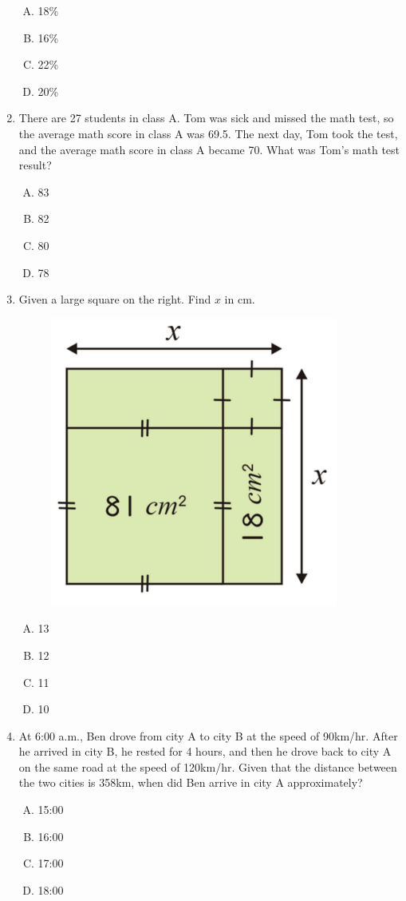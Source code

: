 \documentclass[11pt]{scrartcl}
\begin{document}
\begin{enumerate}
\begin{enumerate}[(A)]
    \item 18\% \item 16\% \item 22\% \item 20\%
\end{enumerate}

\newpage
\item There are 27 students in class A. Tom was sick and missed the math test, so the average math score in class A was 69.5. The next day, Tom took the test, and the average math score in class A became 70. What was Tom's math test result?
\begin{enumerate}[(A)]
    \item 83 \item 82 \item 80 \item 78
\end{enumerate}

\item Given a large square on the right. Find $x$ in cm.
\begin{figure}[h]
    \centering
    \includegraphics{StarGen/0Figure/wmi-2020-5a-square.png}
\end{figure}
\begin{enumerate}[(A)]
    \item 13 \item 12 \item 11 \item 10
\end{enumerate}

\item At 6:00 a.m., Ben drove from city A to city B at the speed of 90km/hr. After he arrived in city B, he rested for 4 hours, and then he drove back to city A on the same road at the speed of 120km/hr. Given that the distance between the two cities is 358km, when did Ben arrive in city A approximately?
\begin{enumerate}[(A)]
    \item 15:00 \item 16:00 \item 17:00 \item 18:00
\end{enumerate}


\end{enumerate}
\end{document}
